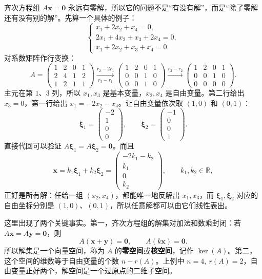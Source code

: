 齐次方程组 \(A\bm{x}=\bm{0}\) 永远有零解，所以它的问题不是“有没有解”，而是“除了零解还有没有别的解”。先算一个具体的例子：
\[
\begin{cases}
x_1+2x_2+x_4=0,\\
2x_1+4x_2+x_3+2x_4=0,\\
x_1+2x_2+x_3+x_4=0.
\end{cases}
\]
对系数矩阵作行变换：
\[
A=\begin{pmatrix}
1&2&0&1\\
2&4&1&2\\
1&2&1&1
\end{pmatrix}
\xrightarrow[r_3-r_1]{r_2-2r_1}
\begin{pmatrix}
1&2&0&1\\
0&0&1&0\\
0&0&1&0
\end{pmatrix}
\xrightarrow{r_3-r_2}
\begin{pmatrix}
1&2&0&1\\
0&0&1&0\\
0&0&0&0
\end{pmatrix}.
\]
主元在第 \(1\)、\(3\) 列，所以 \(x_1,x_3\) 是基本变量，\(x_2,x_4\) 是自由变量。第二行给出 \(x_3=0\)，第一行给出 \(x_1=-2x_2-x_4\)。让自由变量依次取 \((1,0)\) 和 \((0,1)\)：
\[
\bm{\xi}_1=\begin{pmatrix}-2\\1\\0\\0\end{pmatrix},
\qquad
\bm{\xi}_2=\begin{pmatrix}-1\\0\\0\\1\end{pmatrix}.
\]
直接代回可以验证 \(A\bm{\xi}_1=A\bm{\xi}_2=\bm{0}\)。而且
\[
\bm{x}=k_1\bm{\xi}_1+k_2\bm{\xi}_2
=\begin{pmatrix}-2k_1-k_2\\k_1\\0\\k_2\end{pmatrix},
\qquad k_1,k_2\in\mathbb{R},
\]
正好是所有解：任给一组 \((x_2,x_4)\)，都能唯一地反解出 \(x_1,x_3\)，而 \(\bm{\xi}_1,\bm{\xi}_2\) 对应的自由坐标分别是 \((1,0)\)、\((0,1)\)，所以任意解都可以由它们线性表出。

这里出现了两个关键事实。第一，齐次方程组的解集对加法和数乘封闭：若 \(A\bm{x}=A\bm{y}=\bm{0}\)，则
\[
A(\bm{x}+\bm{y})=\bm{0},\qquad A(k\bm{x})=\bm{0}.
\]
所以解集是一个向量空间，称为 \(A\) 的\textbf{零空间}或\textbf{核空间}，记作 \(\ker(A)\)。第二，这个空间的维数等于自由变量的个数 \(n-r(A)\)。上例中 \(n=4,\ r(A)=2\)，自由变量正好两个，解空间是一个过原点的二维子空间。

